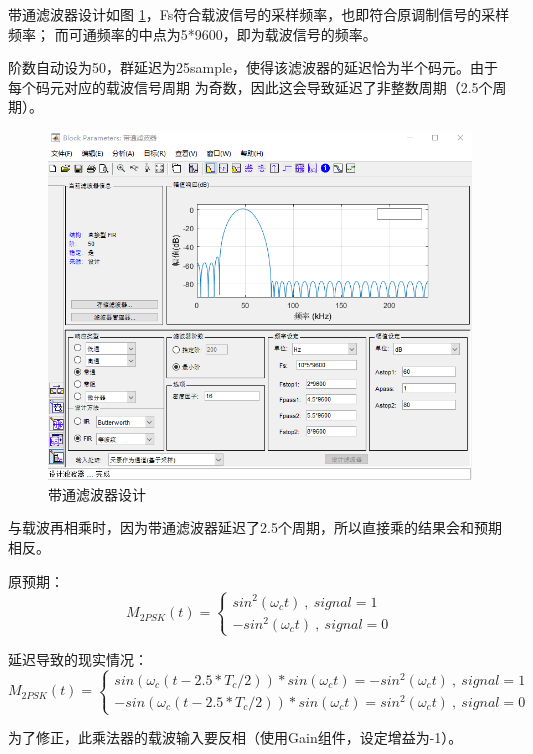 \documentclass[11pt]{paper}
\begin{document}
带通滤波器设计如图 \ref{带通滤波器设计}，Fs符合载波信号的采样频率，也即符合原调制信号的采样频率；
而可通频率的中点为5*9600，即为载波信号的频率。

阶数自动设为50，群延迟为25sample，使得该滤波器的延迟恰为半个码元。由于每个码元对应的载波信号周期
为奇数，因此这会导致延迟了非整数周期（2.5个周期）。

\begin{figure}[ht]
    \centering
    \includegraphics[width=5.9in]{texture/design/带通滤波器.png}
    \caption{带通滤波器设计}
    \label{带通滤波器设计}
\end{figure}

与载波再相乘时，因为带通滤波器延迟了2.5个周期，所以直接乘的结果会和预期相反。

原预期：
$$
    M_{2PSK}(t)=
    \begin{cases}
        sin^2(\omega _{c}t)\ ,\ signal=1 \\
        -sin^2(\omega _{c}t)\ ,\ signal=0
    \end{cases}
$$

延迟导致的现实情况：
$$
    M_{2PSK}(t)=
    \begin{cases}
        sin(\omega _{c}(t-2.5*T_{c}/2))*sin(\omega _{c}t)=-sin^2(\omega _{c}t)\ ,\ signal=1 \\
        -sin(\omega _{c}(t-2.5*T_{c}/2))*sin(\omega _{c}t)=sin^2(\omega _{c}t)\ ,\ signal=0
    \end{cases}
$$

为了修正，此乘法器的载波输入要反相（使用Gain组件，设定增益为-1）。
\end{document}
